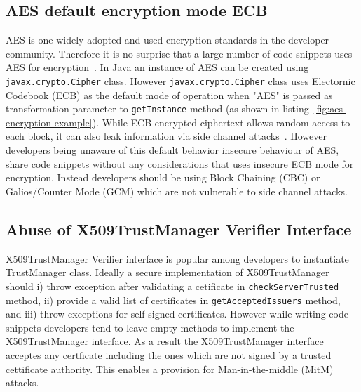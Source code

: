 
\subsection{AES default encryption mode ECB }
AES is one widely adopted and used encryption standards in the developer community. Therefore it is no surprise that a large number of code snippets uses AES for encryption~\cite{aes-encryption}. 
In Java an instance of AES can be created using \texttt{javax.crypto.\-Cipher} class. However \texttt{javax.crypto.Cipher} class uses Electornic Codebook (ECB) as the default mode of operation when  "AES" is passed as transformation parameter to \texttt{getInstance} method (as shown in listing~\ref{fig:aes-encryption-example}). 
While ECB-encrypted ciphertext allows random access to each block, it can also leak information via side channel attacks~\cite{egele2013empirical}. 
However developers being unaware of this default behavior insecure behaviour of AES, share code snippets without any considerations that uses insecure ECB mode for encryption. Instead developers should be using Block Chaining (CBC) or Galios/Counter Mode (GCM) which are not vulnerable to side channel attacks. %

\subsection{Abuse of X509TrustManager Verifier Interface}
X509TrustManager Verifier interface is popular among developers to instantiate TrustManager class. Ideally a secure implementation of X509TrustManager should i) throw exception after validating a cetificate in \texttt{checkServerTrusted} method, ii) provide a valid list of certificates in \texttt{getAcceptedIssuers} method, 
and iii) throw exceptions for self signed certificates. However while writing code snippets developers tend to leave empty methods to implement  the X509TrustManager interface. 
As a result the X509TrustManager interface acceptes any certficate including the ones which are not signed by a trusted cettificate authority. This enables a provision for Man-in-the-middle (MitM) attacks.

